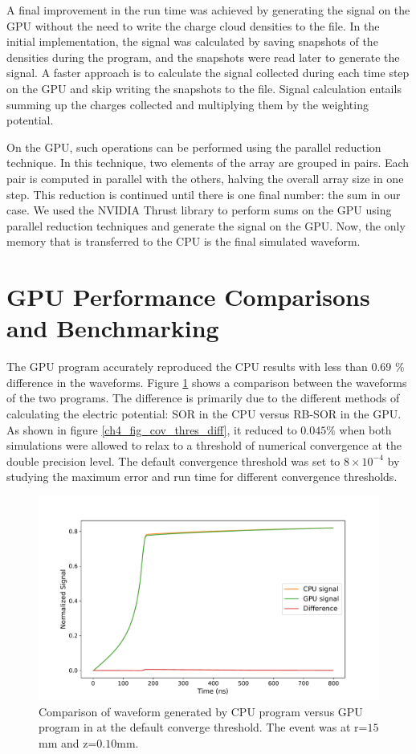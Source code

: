 A final improvement in the run time was achieved by generating the signal on the GPU without the need to write the charge cloud densities to the file. In the initial implementation, the signal was calculated by saving snapshots of the densities during the program, and the snapshots were read later to generate the signal. A faster approach is to calculate the signal collected during each time step on the GPU and skip writing the snapshots to the file. Signal calculation entails summing up the charges collected and multiplying them by the weighting potential. 

On the GPU, such operations can be performed using the parallel reduction technique. In this technique, two elements of the array are grouped in pairs. Each pair is computed in parallel with the others, halving the overall array size in one step. This reduction is continued until there is one final number: the sum in our case. We used the NVIDIA Thrust library to perform sums on the GPU using parallel reduction techniques and generate the signal on the GPU. Now, the only memory that is transferred to the CPU is the final simulated waveform.

\section{GPU Performance Comparisons and Benchmarking}
The GPU program accurately reproduced the CPU results with less than 0.69 $\%$ difference in the waveforms. Figure \ref{ch4_fig_waveform_comp} shows a comparison between the waveforms of the two programs.  The difference is primarily due to the different methods of calculating the electric potential: SOR in the CPU versus RB-SOR in the GPU. As shown in figure \ref{ch4_fig_cov_thres_diff}, it reduced to $0.045\%$ when both simulations were allowed to relax to a threshold of numerical convergence at the double precision level. The default convergence threshold was set to $8\times10^{-4}$ by studying the maximum error and run time for different convergence thresholds.

\begin{figure}[!ht]
\centering
 \includegraphics[width=0.99\linewidth]{ch4/figs/cpu_gpu_wf.pdf}
\caption{Comparison of waveform generated by CPU program versus GPU program in {\ehd} at the default converge threshold. The event was at r=$15$mm and z=$0.10$mm.}
\label{ch4_fig_waveform_comp}
\end{figure}


